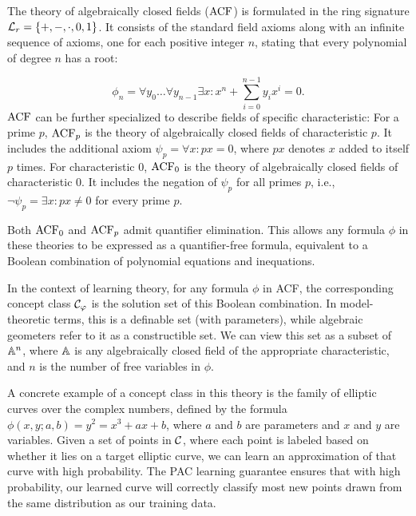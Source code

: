 \begin{example}
\begin{outline}
\0 The theory of algebraically closed fields ($\operatorname{ACF}$) is formulated in the ring signature $\mathcal{L}_r=\{+,-,\cdot, 0,1\}$. It consists of the standard field axioms along with an infinite sequence of axioms, one for each positive integer $n$, stating that every polynomial of degree $n$ has a root: 

$$\phi_n = \forall y_0\ldots\forall y_{n-1} \exists x : x^n+\sum^{n-1}_{i=0} y_i x^i = 0.$$
    \1 $\operatorname{ACF}$ can be further specialized to describe fields of specific characteristic: 
        \2 For a prime $p$,  $\operatorname{ACF}_p$ is the theory of algebraically closed fields of characteristic $p$. It includes the additional axiom $\psi_p = \forall x : px = 0$, where $px$ denotes $x$ added to itself $p$ times.
        \2 For characteristic $0$,  $\operatorname{ACF}_0$ is the theory of algebraically closed fields of characteristic 0. It includes the negation of $\psi_p$ for all primes $p$, i.e., $\neg\psi_p = \exists x : px \neq 0$ for every prime $p$.

\0 Both $\operatorname{ACF}_0$ and $\operatorname{ACF}_p$ admit quantifier elimination. This allows any formula $\phi$ in these theories to be expressed as a quantifier-free formula, equivalent to a Boolean combination of polynomial equations and inequations.

\0 In the context of learning theory, for any formula $\phi$ in ACF, the corresponding concept class $\mathcal{C}_\varphi$ is the solution set of this Boolean combination. In model-theoretic terms, this is a definable set (with parameters), while algebraic geometers refer to it as a constructible set. We can view this set as a subset of $\mathbb{A}^n$, where $\mathbb{A}$ is any algebraically closed field of the appropriate characteristic, and $n$ is the number of free variables in $\phi$.

\0 A concrete example of a concept class in this theory is the family of elliptic curves over the complex numbers, defined by the formula $\phi(x,y;a,b)=y^2=x^3+ax+b$, where $a$ and $b$ are parameters and $x$ and $y$ are variables. Given a set of points in $\mathcal{C}$, where each point is labeled based on whether it lies on a target elliptic curve, we can learn an approximation of that curve with high probability. The PAC learning guarantee ensures that with high probability, our learned curve will correctly classify most new points drawn from the same distribution as our training data.
\end{outline}
\end{example}


